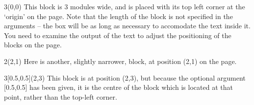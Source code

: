 \documentclass[a4paper]{article}
\begin{document}
\begin{textblock}{3}(0,0)
This block is 3 modules wide, and is placed with its top left corner
at the `origin' on the page.  Note that the length of the block is not
specified in the arguments -- the box will be as long as necessary to
accomodate the text inside it.  You need to examine the output of the
text to adjust the positioning of the blocks on the page.
\end{textblock}

\begin{textblock}{2}(2,1)
Here is another, slightly narrower, block, at position (2,1) on the page.
\end{textblock}

\begin{textblock}{3}[0.5,0.5](2,3)
This block is at position (2,3), but because the optional argument
[0.5,0.5] has been given, it is the centre of the block which is
located at that point, rather than the top-left corner.
\end{textblock}
\end{document}
